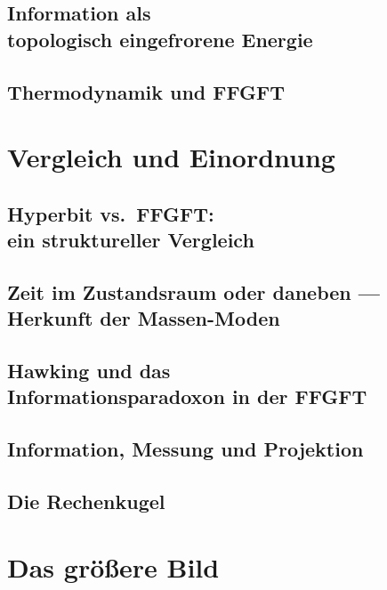 \documentclass[11pt,oneside]{book}
\theoremstyle{plain}
\begin{document}
\chapter[Information als topologisch eingefrorene Energie]{Information als\\ topologisch eingefrorene Energie}

\chapter{Thermodynamik und FFGFT}


\part{Vergleich und Einordnung}
\chapter[Hyperbit vs.\ FFGFT]{Hyperbit vs.\ FFGFT:\\ ein struktureller Vergleich}
\label{ch:vergleich_matzke_ffgft}

\chapter[Zeit im Zustandsraum]{Zeit im Zustandsraum oder daneben ---\\ Herkunft der Massen-Moden}

\chapter[Hawking und das Informationsparadoxon]{Hawking und das\\ Informationsparadoxon in der FFGFT}
\label{ch:hawking_info}

\chapter{Information, Messung und Projektion}

\chapter{Die Rechenkugel}


\part{Das größere Bild}
\end{document}
